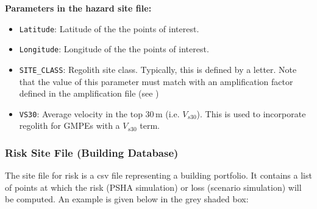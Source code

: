 \textbf{Parameters in the hazard site file:}
\begin{itemize}
\item \texttt{Latitude}: Latitude of the the points of interest.
\item \texttt{Longitude}: Longitude of the the points of interest.
\item \texttt{SITE\_CLASS}: Regolith site class. Typically, this is defined
by a letter. Note that the value of this parameter must match with
an amplification factor defined in the amplification file (see
)
\item \texttt{VS30}: Average velocity in the top 30\,m (i.e. $V_{s30}$). This is used
to incorporate regolith for GMPEs with a $V_{s30}$ term.
\end{itemize}

\subsubsection{Risk Site File (Building Database)}

The site file for risk is a csv file representing a building
portfolio. It contains a list of points at which the risk (PSHA simulation)
 or loss (scenario simulation) will be computed. An example is
 given below in the grey shaded box:



